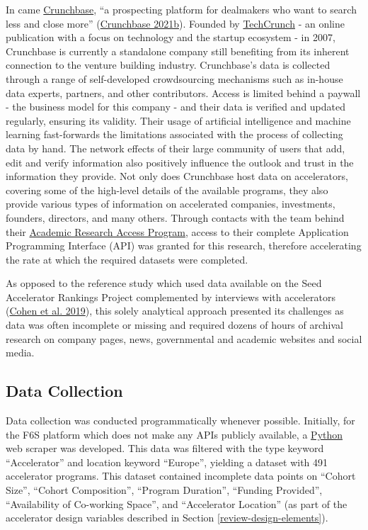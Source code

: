 \documentclass[
  12pt,
]{article}
\begin{document}
In came \href{https://www.crunchbase.com/}{Crunchbase}, ``a prospecting platform for dealmakers who want to search less and close more'' (\protect\hyperlink{ref-crunchbase_2021}{Crunchbase 2021b}). Founded by \href{https://techcrunch.com}{TechCrunch} - an online publication with a focus on technology and the startup ecosystem - in 2007, Crunchbase is currently a standalone company still benefiting from its inherent connection to the venture building industry. Crunchbase's data is collected through a range of self-developed crowdsourcing mechanisms such as in-house data experts, partners, and other contributors. Access is limited behind a paywall - the business model for this company - and their data is verified and updated regularly, ensuring its validity. Their usage of artificial intelligence and machine learning fast-forwards the limitations associated with the process of collecting data by hand. The network effects of their large community of users that add, edit and verify information also positively influence the outlook and trust in the information they provide. Not only does Crunchbase host data on accelerators, covering some of the high-level details of the available programs, they also provide various types of information on accelerated companies, investments, founders, directors, and many others. Through contacts with the team behind their \href{https://about.crunchbase.com/partners/academic-research-access/}{Academic Research Access Program}, access to their complete Application Programming Interface (API) was granted for this research, therefore accelerating the rate at which the required datasets were completed.

As opposed to the reference study which used data available on the Seed Accelerator Rankings Project complemented by interviews with accelerators (\protect\hyperlink{ref-cohen_design_2019}{Cohen et al. 2019}), this solely analytical approach presented its challenges as data was often incomplete or missing and required dozens of hours of archival research on company pages, news, governmental and academic websites and social media.

\hypertarget{data-collection}{%
\subsection{Data Collection}\label{data-collection}}

Data collection was conducted programmatically whenever possible. Initially, for the F6S platform which does not make any APIs publicly available, a \href{https://www.python.org}{Python} web scraper was developed. This data was filtered with the type keyword ``Accelerator'' and location keyword ``Europe'', yielding a dataset with 491 accelerator programs. This dataset contained incomplete data points on ``Cohort Size'', ``Cohort Composition'', ``Program Duration'', ``Funding Provided'', ``Availability of Co-working Space'', and ``Accelerator Location'' (as part of the accelerator design variables described in Section \ref{review-design-elements}).
\end{document}
